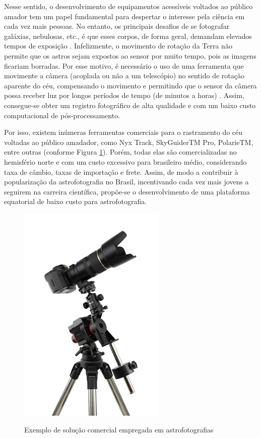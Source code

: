 Nesse sentido, o desenvolvimento de equipamentos acessíveis voltados ao público amador tem um papel fundamental para despertar o interesse pela ciência em cada vez mais pessoas. No entanto, os principais desafios de se fotografar galáxias, nebulosas, etc., é que esses corpos, de forma geral, demandam elevados tempos de exposição \cite{site:introCabau}. Infelizmente, o movimento de rotação da Terra não permite que os astros sejam expostos ao sensor por muito tempo, pois as imagens ficariam borradas. Por esse motivo, é necessário o uso de uma ferramenta que movimente a câmera (acoplada ou não a um telescópio) no sentido de rotação aparente do céu, compensando o movimento e permitindo que o sensor da câmera possa receber luz por longos períodos de tempo (de minutos a horas) \cite{site:introCabau}. Assim, consegue-se obter um registro fotográfico de alta qualidade e com um baixo custo computacional de pós-processamento.


Por isso, existem inúmeras ferramentas comerciais para o rastramento do céu voltadas ao público amadador, como Nyx Track, SkyGuiderTM Pro, PolarieTM, entre outras (conforme Figura \ref{fig:skyguider}). Porém, todas elas são comercializadas no hemisfério norte e com um custo excessivo para brasileiro médio, considerando taxa de câmbio, taxas de importação e frete. Assim, de modo a contribuir à popularização da astrofotografia no Brasil, incentivando cada vez mais jovens a seguirem na carreira científica, propõe-se o desenvolvimento de uma plataforma equatorial de baixo custo para astrofotografia. 


\begin{figure}[htb]
	\centering
	\caption{Exemplo de solução comercial empregada em astrofotografias}
	\includegraphics[width=0.3\linewidth]{figuras/skyguider}
	\label{fig:skyguider}
\end{figure}
